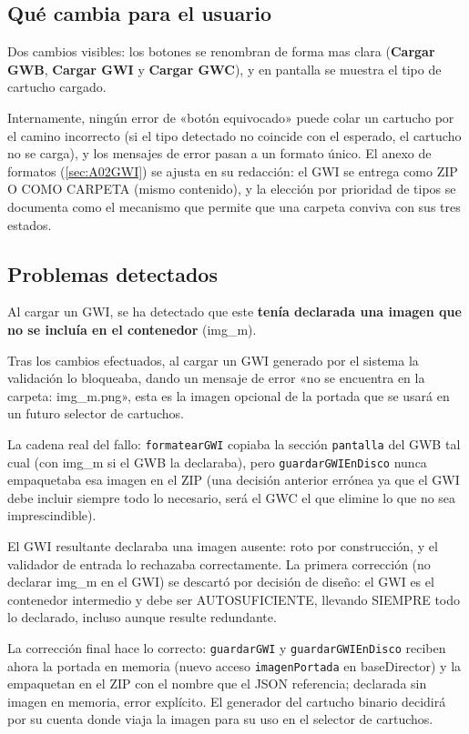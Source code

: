\subsection{Qué cambia para el usuario}
\label{sec:F5I9Usuario}

Dos cambios visibles: los botones se
renombran de forma mas clara (\textbf{Cargar GWB}, 
\textbf{Cargar GWI} y \textbf{Cargar GWC}), y en pantalla se
muestra el tipo de cartucho cargado. 

Internamente, ningún error de
«botón equivocado» puede colar un cartucho por el camino incorrecto
(si el tipo detectado no coincide con el esperado, el cartucho no se
carga), y los mensajes de error pasan a un formato único. El anexo
de formatos (\ref{sec:A02GWI}) se ajusta en su redacción: el GWI se
entrega como ZIP O COMO CARPETA (mismo contenido), y la elección por
prioridad de tipos se documenta como el mecanismo que permite que
una carpeta conviva con sus tres estados.

\subsection{Problemas detectados}
\label{sec:F5I9Problemas}

Al cargar un GWI, se ha detectado que este \textbf{tenía declarada una imagen que no se incluía en el contenedor} (img\_m). 

Tras los cambios efectuados, al cargar un GWI generado por el sistema la
validación lo bloqueaba, dando un mensaje de error «no se encuentra en la carpeta:
img\_m.png», esta es la imagen opcional de la portada que se usará en un futuro selector de cartuchos. 

La cadena real del fallo:
\texttt{formatearGWI} copiaba la sección \texttt{pantalla} del GWB tal
cual (con img\_m si el GWB la declaraba), pero \texttt{guardarGWIEnDisco} 
nunca empaquetaba esa imagen en el ZIP (una decisión anterior errónea ya 
que el GWI debe incluir siempre todo lo necesario, será el GWC el que 
elimine lo que no sea imprescindible). 

El GWI resultante declaraba una imagen ausente: roto por construcción, y
el validador de entrada lo rechazaba correctamente. La primera
corrección (no declarar img\_m en el GWI) se descartó por decisión de
diseño: el GWI es el contenedor intermedio y debe ser AUTOSUFICIENTE,
llevando SIEMPRE todo lo declarado, incluso aunque resulte redundante.

La corrección final hace lo correcto: \texttt{guardarGWI} y
\texttt{guardarGWIEnDisco} reciben ahora la portada en memoria (nuevo
acceso \texttt{imagenPortada} en baseDirector) y la empaquetan en el
ZIP con el nombre que el JSON referencia; declarada sin imagen en
memoria, error explícito. El generador del cartucho binario decidirá 
por su cuenta donde viaja la imagen para su uso en el selector de cartuchos.